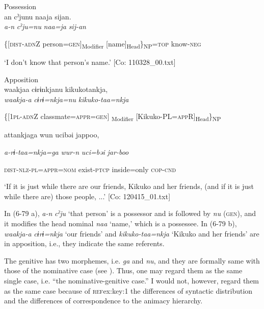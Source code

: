 \ea\label{ex:6-79}
\ea Possession\\
{\TM}
\gll  an  cˀjunu  naaja  sijan.\\

      \textit{a-n}  \textit{cˀju=nu}  \textit{naa=ja}  \textit{sij-an}

      \{[\textsc{dist}-\textsc{adn}Z  person=\textsc{gen}]\textsubscript{Modifier}  [name]\textsubscript{Head}\}\textsubscript{NP}=\textsc{top}  know-\textsc{neg}

\glt ‘I don’t know that person’s name.’ [Co: 110328\_00.txt]
\z

 \ex Apposition\\
{\TM}
\gll  waakjaa  cɨrɨnkjanu  kikukotankja,\\

      \textit{waakja-a}  \textit{cɨrɨ=nkja=nu}  \textit{kikuko-taa=nkja}

      \{[1\textsc{pl}-\textsc{adn}Z  classmate=\textsc{appr}=\textsc{gen}]\textsubscript{ Modifier}  [Kikuko-PL=\textsc{app}R]\textsubscript{Head}\}\textsubscript{NP}

      attankjaga  wun  ucibəi  jappoo,

      \textit{a-rɨ-taa=nkja=ga}  \textit{wur-n}  \textit{uci=bəi}  \textit{jar-boo}

      \textsc{dist}-\textsc{nlz}-\textsc{pl}=\textsc{appr}=\textsc{nom}  exist-\textsc{ptcp}  inside=only  \textsc{cop}-\textsc{cnd}

\glt ‘If it is just while there are our friends, Kikuko and her friends, (and if it is just while there are) those people, ...’ [Co: 120415\_01.txt]
\z

In (6-79 a), \textit{a-n} \textit{cˀju} ‘that person’ is a possessor and is followed by \textit{nu} (\textsc{gen}), and it modifies the head nominal \textit{naa} ‘name,’ which is a possessee. In (6-79 b), \textit{waakja-a} \textit{cɨrɨ=nkja} ‘our friends’ and \textit{kikuko-taa=nkja} ‘Kikuko and her friends’ are in apposition, i.e., they indicate the same referents.

The genitive has two morphemes, i.e. \textit{ga} and \textit{nu}, and they are formally same with those of the nominative case (see ). Thus, one may regard them as the same single case, i.e. “the nominative-genitive case.” I would not, however, regard them as the same case because of \textsc{ref}{ex:key:1} the differences of syntactic distribution and  the differences of correspondence to the animacy hierarchy.

